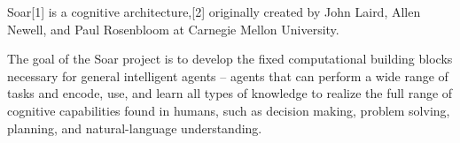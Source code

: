 \documentclass[a4paper]{article}
\title{}
\date{}
\begin{document}
    \maketitle
    Soar[1] is a cognitive architecture,[2] originally created by John Laird, Allen Newell, and Paul Rosenbloom at Carnegie Mellon University.
    
    The goal of the Soar project is to develop the fixed computational building blocks necessary for general intelligent agents – agents that can perform a wide range of tasks and encode, use, and learn all types of knowledge to realize the full range of cognitive capabilities found in humans, such as decision making, problem solving, planning, and natural-language understanding. \url{}
\end{document}
